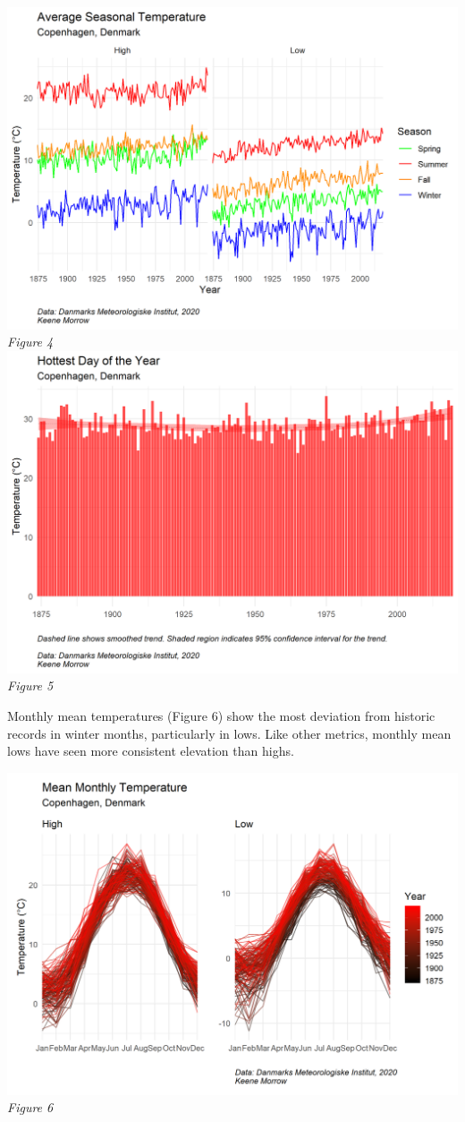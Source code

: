 \documentclass[
]{article}
\begin{document}
\includegraphics{figures/mean_season_temp.png} \emph{Figure 4}
\includegraphics{figures/max_T.png} \emph{Figure 5}

Monthly mean temperatures (Figure 6) show the most deviation from
historic records in winter months, particularly in lows. Like other
metrics, monthly mean lows have seen more consistent elevation than
highs.

\includegraphics{figures/mean_month_temp.png} \emph{Figure 6}
\end{document}
